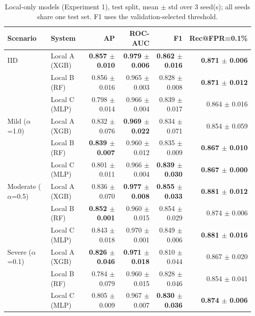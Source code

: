 \begin{table}[t]
\centering
\scriptsize
\caption{Local-only models (Experiment 1), test split, mean $\pm$ std over 3 seed(s); all seeds share one test set. F1 uses the validation-selected threshold.}
\label{tab:local}
\begin{tabular}{llrrrr}
\toprule
Scenario & System & AP & ROC-AUC & F1 & Rec@FPR=0.1\% \\
\midrule
IID & Local A (XGB) & \textbf{0.857 $\pm$ 0.010} & \textbf{0.979 $\pm$ 0.006} & \textbf{0.862 $\pm$ 0.016} & \textbf{0.871 $\pm$ 0.006} \\
 & Local B (RF) & 0.856 $\pm$ 0.016 & 0.965 $\pm$ 0.003 & 0.828 $\pm$ 0.008 & \textbf{0.871 $\pm$ 0.012} \\
 & Local C (MLP) & 0.798 $\pm$ 0.014 & 0.966 $\pm$ 0.004 & 0.839 $\pm$ 0.017 & 0.864 $\pm$ 0.016 \\
\midrule
Mild ($\alpha$=1.0) & Local A (XGB) & 0.832 $\pm$ 0.076 & \textbf{0.969 $\pm$ 0.022} & 0.834 $\pm$ 0.071 & 0.854 $\pm$ 0.059 \\
 & Local B (RF) & \textbf{0.839 $\pm$ 0.007} & 0.960 $\pm$ 0.012 & 0.835 $\pm$ 0.009 & \textbf{0.867 $\pm$ 0.010} \\
 & Local C (MLP) & 0.801 $\pm$ 0.011 & 0.966 $\pm$ 0.004 & \textbf{0.839 $\pm$ 0.030} & \textbf{0.867 $\pm$ 0.000} \\
\midrule
Moderate ($\alpha$=0.5) & Local A (XGB) & 0.836 $\pm$ 0.070 & \textbf{0.977 $\pm$ 0.008} & \textbf{0.855 $\pm$ 0.033} & \textbf{0.881 $\pm$ 0.012} \\
 & Local B (RF) & \textbf{0.852 $\pm$ 0.001} & 0.960 $\pm$ 0.015 & 0.854 $\pm$ 0.029 & 0.874 $\pm$ 0.006 \\
 & Local C (MLP) & 0.843 $\pm$ 0.018 & 0.970 $\pm$ 0.001 & 0.849 $\pm$ 0.006 & \textbf{0.881 $\pm$ 0.016} \\
\midrule
Severe ($\alpha$=0.1) & Local A (XGB) & \textbf{0.826 $\pm$ 0.046} & \textbf{0.971 $\pm$ 0.018} & 0.810 $\pm$ 0.044 & 0.867 $\pm$ 0.020 \\
 & Local B (RF) & 0.784 $\pm$ 0.079 & 0.960 $\pm$ 0.015 & 0.828 $\pm$ 0.046 & 0.854 $\pm$ 0.041 \\
 & Local C (MLP) & 0.805 $\pm$ 0.009 & 0.967 $\pm$ 0.007 & \textbf{0.830 $\pm$ 0.036} & \textbf{0.874 $\pm$ 0.006} \\
\bottomrule
\end{tabular}
\end{table}
